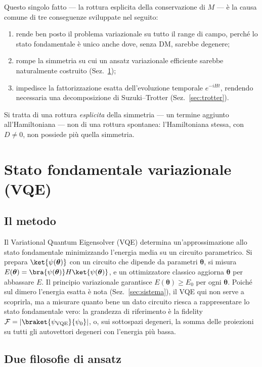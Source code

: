 \documentclass[11pt,a4paper]{article}
\begin{document}
Questo singolo fatto --- la rottura esplicita della conservazione di $M$ ---
è la causa comune di tre conseguenze sviluppate nel seguito:

\begin{enumerate}
\item rende ben posto il problema variazionale su tutto il range di campo,
perché lo stato fondamentale è unico anche dove, senza DM, sarebbe
degenere;
\item rompe la simmetria su cui un ansatz variazionale efficiente sarebbe
naturalmente costruito (Sez.~\ref{sec:vqe});
\item impedisce la fattorizzazione esatta dell'evoluzione temporale
$e^{-iHt}$, rendendo necessaria una decomposizione di Suzuki--Trotter
(Sez.~\ref{sec:trotter}).
\end{enumerate}

Si tratta di una rottura \emph{esplicita} della simmetria --- un termine
aggiunto all'Hamiltoniana --- non di una rottura spontanea: l'Hamiltoniana
stessa, con $D\neq0$, non possiede più quella simmetria.

\section{Stato fondamentale variazionale (VQE)}
\label{sec:vqe}

\subsection{Il metodo}

Il Variational Quantum Eigensolver (VQE) determina un'approssimazione allo
stato fondamentale minimizzando l'energia media su un circuito
parametrico. Si prepara $\ket{\psi(\boldsymbol\theta)}$ con un circuito che
dipende da parametri $\boldsymbol\theta$, si misura
$E(\boldsymbol\theta)=\bra{\psi(\boldsymbol\theta)}H\ket{\psi(\boldsymbol\theta)}$,
e un ottimizzatore classico aggiorna $\boldsymbol\theta$ per abbassare
$E$. Il principio variazionale garantisce $E(\boldsymbol\theta)\ge E_0$
per ogni $\boldsymbol\theta$. Poiché sul dimero l'energia esatta è nota
(Sez.~\ref{sec:sistema}), il VQE qui non serve a scoprirla, ma a misurare
quanto bene un dato circuito riesca a rappresentare lo stato fondamentale
vero: la grandezza di riferimento è la fidelity
$\mathcal F=\lvert\braket{\psi_{\rm VQE}}{\psi_0}\rvert$, o, sui
sottospazi degeneri, la somma delle proiezioni su tutti gli autovettori
degeneri con l'energia più bassa.

\subsection{Due filosofie di ansatz}
\end{document}
